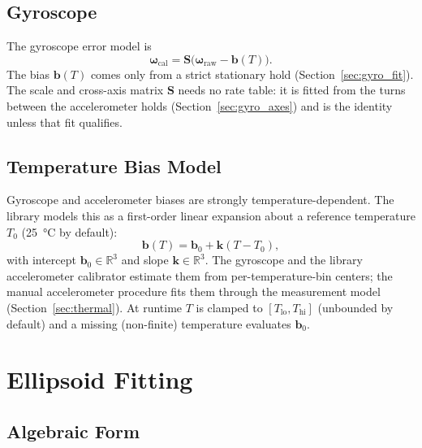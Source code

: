\documentclass[conference]{IEEEtran}
\begin{document}
    \subsection{Gyroscope}

    The gyroscope error model is
    \begin{equation}
        \boldsymbol{\omega}_\text{cal} = \mathbf{S}\bigl(\boldsymbol{\omega}_\text{raw}
        - \mathbf{b}(T)\bigr).
    \end{equation}
    The bias $\mathbf{b}(T)$ comes only from a strict stationary hold
    (Section~\ref{sec:gyro_fit}). The scale and cross-axis matrix
    $\mathbf{S}$ needs no rate table: it is fitted from the turns between the
    accelerometer holds (Section~\ref{sec:gyro_axes}) and is the identity
    unless that fit qualifies.

    \subsection{Temperature Bias Model}
    \label{sec:tempbias}

    Gyroscope and accelerometer biases are strongly temperature-dependent.
    The library models this as a first-order linear expansion about a
    reference temperature $T_0$ (\SI{25}{\degreeCelsius} by default):
    \begin{equation}
        \mathbf{b}(T) = \mathbf{b}_0 + \mathbf{k}(T - T_0),
        \label{eq:tempbias}
    \end{equation}
    with intercept $\mathbf{b}_0 \in \mathbb{R}^3$ and slope
    $\mathbf{k} \in \mathbb{R}^3$. The gyroscope and the library
    accelerometer calibrator estimate them from per-temperature-bin centers;
    the manual accelerometer procedure fits them through the measurement
    model (Section~\ref{sec:thermal}).
    At runtime $T$ is clamped to $[T_\text{lo}, T_\text{hi}]$ (unbounded by
    default) and a missing (non-finite) temperature evaluates
    $\mathbf{b}_0$.

    \section{Ellipsoid Fitting}
    \label{sec:ellipsoid}

    \subsection{Algebraic Form}
\end{document}
